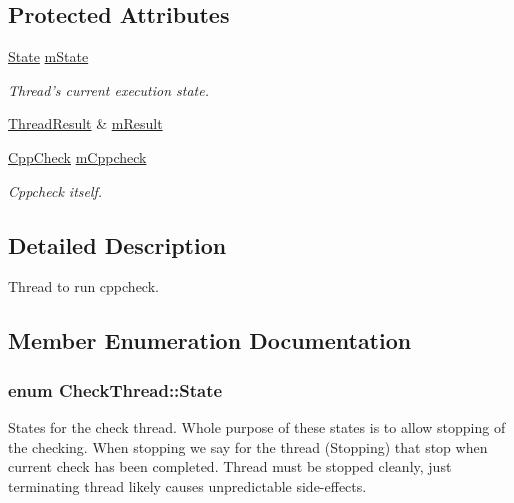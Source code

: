 \subsection*{Protected Attributes}
\begin{DoxyCompactItemize}
\item 
\hyperlink{class_check_thread_a39bfc27bb753492ce57fc6d5aa17e664}{State} \hyperlink{class_check_thread_ade4d64e9a4d78d3793c121e71939cfde}{m\-State}
\begin{DoxyCompactList}\small\item\em Thread's current execution state. \end{DoxyCompactList}\item 
\hyperlink{class_thread_result}{Thread\-Result} \& \hyperlink{class_check_thread_afceff6de6b5d0c2806256f30aad4722e}{m\-Result}
\item 
\hyperlink{class_cpp_check}{Cpp\-Check} \hyperlink{class_check_thread_a9043a9eb7e1fbd4c65fc49457e2109b7}{m\-Cppcheck}
\begin{DoxyCompactList}\small\item\em Cppcheck itself. \end{DoxyCompactList}\end{DoxyCompactItemize}


\subsection{Detailed Description}
Thread to run cppcheck. 

\subsection{Member Enumeration Documentation}
\hypertarget{class_check_thread_a39bfc27bb753492ce57fc6d5aa17e664}{
\subsubsection[{State}]{\setlength{\rightskip}{0pt plus 5cm}enum {\bf Check\-Thread\-::\-State}\hspace{0.3cm}{\ttfamily [protected]}}}\label{class_check_thread_a39bfc27bb753492ce57fc6d5aa17e664}


States for the check thread. Whole purpose of these states is to allow stopping of the checking. When stopping we say for the thread (Stopping) that stop when current check has been completed. Thread must be stopped cleanly, just terminating thread likely causes unpredictable side-\/effects. 

